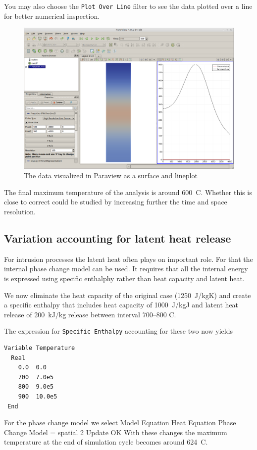 You may also choose the \texttt{Plot Over Line} filter to see the data plotted 
over a line for better numerical inspection. 

\begin{figure}
\begin{center}
\includegraphics[width=140mm]{GeoSlabParaview}
\caption{The data visualized in Paraview as a surface and lineplot}
\label{fg:GeoSlabParaview}
\end{center}
\end{figure}

The final maximum temperature of the analysis is around 600~C. Whether this is close to correct could
be studied by increasing further the time and space resolution. 


\subsection{Variation accounting for latent heat release}

For intrusion processes the latent heat often plays on important role. 
For that the internal phase change model can be used. It requires that 
all the internal energy is expressed using specific enthalphy rather than
heat capacity and latent heat. 

We now eliminate the heat capacity of the original case (1250~J/kgK) and
create a specific enthalpy that includes heat capacity of 1000~J/kgJ 
and latent heat release of 200~kJ/kg release between interval 700--800 C.

The expression for \texttt{Specific Enthalpy} accounting for these two now yields
\begin{verbatim}
Variable Temperature
  Real
    0.0  0.0
    700  7.0e5
    800  9.0e5
    900  10.0e5
 End 
\end{verbatim}
For the phase change model we select 
\ttbegin
Model
  Equation
    Heat Equation
      Phase Change Model = spatial 2
  Update
  OK
\ttend        
With these changes the maximum temperature at the end of simulation cycle 
becomes around 624~C.  


\hfill
\mbox{}






